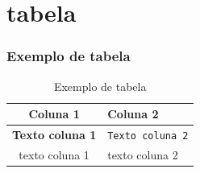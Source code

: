 \section{tabela}
\begin{frame}
\frametitle{Exemplo de tabela}
\justifying

\begin{table}[htb!]
    \centering
    \begin{tabular}{|c|p{4cm}|}
        \hline
       Coluna 1  &  Coluna 2\\
       \hline
        \textbf{Texto coluna 1} & \texttt{Texto coluna 2} \\
        \hline
         texto coluna 1 & texto coluna 2\\
        \hline
    \end{tabular}
    \caption{Exemplo de tabela}
    \label{exemplo}
\end{table}
\end{frame}